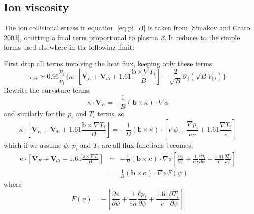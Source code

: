 \documentclass[12pt,a4paper]{article}
\begin{document}
\subsection{Ion viscosity}

The ion collisional stress in equation~\ref{eq:pi_ci}
is taken from [Simakov and Catto 2003], omitting a final
term proportional to plasma $\beta$. It reduces to the simple forms used elsewhere in the following limit:

First drop all terms involving the heat flux, keeping only these terms:
\begin{equation}
  \pi_{ci} \simeq 0.96\frac{p_i}{\nu_i}\Bigg\{\kappa\cdot\left[\mathbf{V}_E + \mathbf{V}_{di} + 1.61\frac{\mathbf{b}\times\nabla T_i}{B}\right]- \frac{2}{\sqrt{B}}\partial_{||}\left(\sqrt{B}V_{||i}\right) \Bigg\}
\end{equation}
Rewrite the curvature terms:
\begin{equation}
\kappa\cdot\mathbf{V}_E = - \frac{1}{B}\left(\mathbf{b}\times\kappa\right)\cdot\nabla\phi
\end{equation}
and similarly for the $p_i$ and $T_i$ terms, so
\begin{equation}
\kappa\cdot\left[\mathbf{V}_E + \mathbf{V}_{di} + 1.61\frac{\mathbf{b}\times\nabla T_i}{B}\right] = -\frac{1}{B}\left(\mathbf{b}\times\kappa\right)\cdot\left[\nabla\phi + \frac{\nabla p_i}{en} + 1.61\frac{\nabla T_i}{e}\right]
\end{equation}
which if we assume $\phi$, $p_i$ and $T_i$ are all flux functions becomes:
\begin{eqnarray}
  \kappa\cdot\left[\mathbf{V}_E + \mathbf{V}_{di} + 1.61\frac{\mathbf{b}\times\nabla T_i}{B}\right] &\simeq& -\frac{1}{B}\left(\mathbf{b}\times\kappa\right)\cdot\nabla\psi\left[\frac{\partial\phi}{\partial\psi} + \frac{1}{en}\frac{\partial p_i}{\partial\psi} + \frac{1.61}{e}\frac{\partial T_i}{\partial\psi}\right] \nonumber \\
  &=& \frac{1}{B}\left(\mathbf{b}\times\kappa\right)\cdot\nabla\psi F\left(\psi\right)
\end{eqnarray}
where
\begin{equation}
F\left(\psi\right) = -\left[\frac{\partial\phi}{\partial\psi} + \frac{1}{en}\frac{\partial p_i}{\partial\psi} + \frac{1.61}{e}\frac{\partial T_i}{\partial\psi}\right]
\end{equation}
\end{document}
